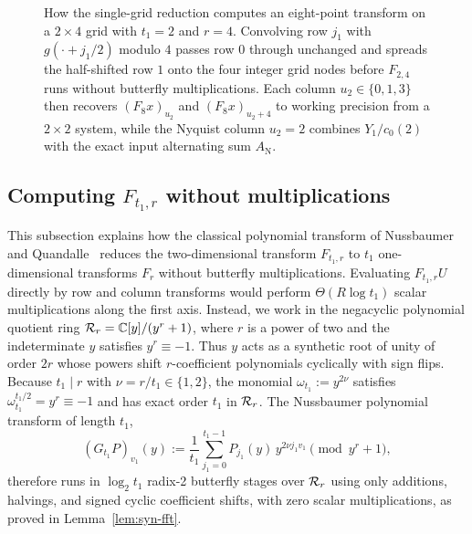 \begin{figure}[!ht]
{%
}
\caption{How the single-grid reduction computes an eight-point transform on a $2 \times 4$ grid with $t_1 = 2$ and $r = 4$. Convolving row $j_1$ with $g(\cdot + j_1/2)$ modulo $4$ passes row $0$ through unchanged and spreads the half-shifted row $1$ onto the four integer grid nodes before $F_{2,4}$ runs without butterfly multiplications. Each column $u_2 \in \{0, 1, 3\}$ then recovers $(F_8 x)_{u_2}$ and $(F_8 x)_{u_2 + 4}$ to working precision from a $2 \times 2$ system, while the Nyquist column $u_2 = 2$ combines $Y_1 / c_0(2)$ with the exact input alternating sum $A_{\mathrm{N}}$.}
\label{fig:shift-grid}
\end{figure}

\subsection{Computing \texorpdfstring{$F_{t_1, r}$}{F\_\{t1, r\}} without multiplications}\label{sec:overview-poly}

This subsection explains how the classical polynomial transform of Nussbaumer and Quandalle~\cite{NQ79,Nussbaumer80,Nussbaumer82} reduces the two-dimensional transform $F_{t_1, r}$ to $t_1$ one-dimensional transforms $F_r$ without butterfly multiplications. Evaluating $F_{t_1, r} U$ directly by row and column transforms would perform $\Theta(R \log t_1)$ scalar multiplications along the first axis. Instead, we work in the negacyclic polynomial quotient ring $\mathcal{R}_r = \mathbb{C}[y]/(y^r + 1)$, where $r$ is a power of two and the indeterminate $y$ satisfies $y^r \equiv -1$. Thus $y$ acts as a synthetic root of unity of order $2r$ whose powers shift $r$-coefficient polynomials cyclically with sign flips. Because $t_1 \mid r$ with $\nu = r / t_1 \in \{1, 2\}$, the monomial $\omega_{t_1} := y^{2\nu}$ satisfies $\omega_{t_1}^{t_1/2} = y^r \equiv -1$ and has exact order $t_1$ in $\mathcal{R}_r$. The Nussbaumer polynomial transform of length $t_1$,
\[
  (G_{t_1} P)_{v_1}(y) := \frac{1}{t_1}\sum_{j_1=0}^{t_1-1} P_{j_1}(y)\, y^{2\nu j_1 v_1} \pmod{y^r + 1},
\]
therefore runs in $\log_2 t_1$ radix-2 butterfly stages over $\mathcal{R}_r$ using only additions, halvings, and signed cyclic coefficient shifts, with zero scalar multiplications, as proved in Lemma~\ref{lem:syn-fft}.

